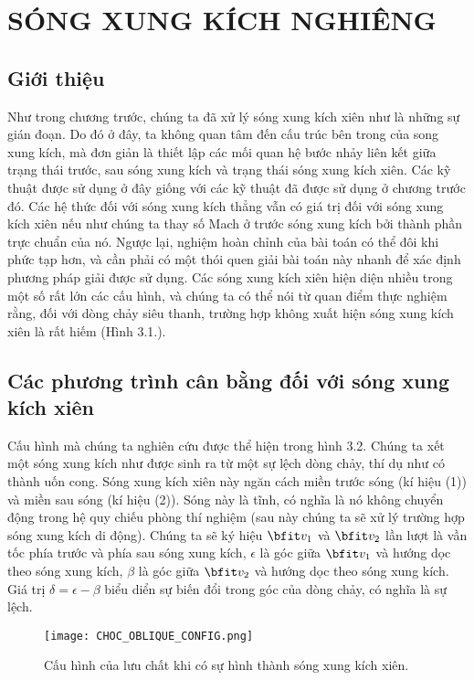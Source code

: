 \documentclass[DONG_CHAY_NEN_DUOC.tex]{subfiles}
\begin{document}
\chapter{SÓNG XUNG KÍCH NGHIÊNG}
\section{Giới thiệu}
Như trong chương trước, chúng ta đã xử lý sóng xung kích xiên như là những sự gián đoạn. Do đó ở đây, ta không quan tâm đến cấu trúc bên trong của song xung kích, mà đơn giản là thiết lập các mối quan hệ bước nhảy liên kết giữa trạng thái trước, sau sóng xung kích và trạng thái sóng xung kích xiên. Các kỹ thuật được sử dụng ở đây giống với các kỹ thuật đã được sử dụng ở chương trước đó. Các hệ thức đối với sóng xung kích thẳng vẫn có giá trị đối với sóng xung kích xiên nếu như chúng ta thay số Mach ở trước sóng xung kích bởi thành phần trực chuẩn của nó. Ngược lại, nghiệm hoàn chỉnh của bài toán có thể đôi khi phức tạp hơn, và cần phải có một thói quen giải bài toán này nhanh để xác định phương pháp giải được sử dụng. Các sóng xung kích xiên hiện diện nhiều trong một số rất lớn các cấu hình, và chúng ta có thể nói từ quan điểm thực nghiệm rằng, đối với dòng chảy siêu thanh, trường hợp không xuất hiện sóng xung kích xiên là rất hiếm (Hình 3.1.).
\section{Các phương trình cân bằng đối với sóng xung kích xiên}
Cấu hình mà chúng ta nghiên cứu được thể hiện trong hình 3.2. Chúng ta xết một sóng xung kích như được sinh ra từ một sự lệch dòng chảy, thí dụ như có thành uốn cong. Sóng xung kích xiên này ngăn cách miền trước sóng (kí hiệu (1)) và miền sau sóng (kí hiệu (2)). Sóng này là tĩnh, có nghĩa là nó không chuyển động trong hệ quy chiếu phòng thí nghiệm (sau này chúng ta sẽ xử lý trường hợp sóng xung kích di động). Chúng ta sẽ ký hiệu $\bfit v_1$ và $\bfit v_2$ lần lượt là vần tốc phía trước và phía sau sóng xung kích, $\epsilon$ là góc giữa $\bfit v_1$ và hướng dọc theo sóng xung kích, $\beta$ là góc giữa $\bfit v_2$ và hướng dọc theo sóng xung kích. Giá trị $\delta=\epsilon-\beta$ biểu diển sự biến đổi trong góc của dòng chảy, có nghĩa là sự lệch.\\
\begin{figure}[h!]
	\centering
	\texttt{[image: CHOC\_OBLIQUE\_CONFIG.png]}
	\caption{Cấu hình của lưu chất khi có sự hình thành sóng xung kích xiên.}
\end{figure}
\end{document}
